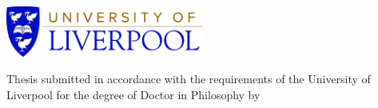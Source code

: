 \begin{titlepage}
	\centering
	\vspace*{1cm}
	\includegraphics[width=65mm]{Figures/UoL_Logo.jpg}\par\vspace{1cm}
		\vspace{2cm}
	{\huge \Title\par}
	\vspace{5cm}
	{Thesis submitted in accordance with the requirements of the University of Liverpool for the  degree  of  Doctor  in  Philosophy by  \par}
	\vspace{1cm}
	{\textbf{\Author}\par}
	\vfill

	{\large \monthname\, \the\year\par}
\end{titlepage}